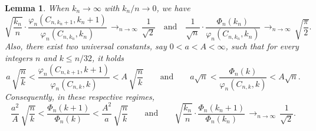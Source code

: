 \documentclass[11pt]{article}
\theoremstyle{plain}
\newtheorem{lemma}[theorem]{Lemma}
\theoremstyle{definition}
\theoremstyle{remark}
\newcommand{\cv}[1][n]{\,\mathop{\longrightarrow}^{}_{#1 \to \infty}\,}
\begin{document}
\begin{lemma}\label{lem:phi_et_Phi}
When $k_n\to\infty$ with $k_n/n\to0$, we have
\begin{equation}\label{eq:equiv_kn}
\sqrt{\frac{k_n}{n}} \cdot \frac{\varphi_n(C_{n,k_n+1},k_n+1)}{\varphi_n(C_{n,k_n},k_n)} \cv \frac{1}{\sqrt{2}}
\quad\text{and}\quad
\frac{1}{\sqrt{n}} \cdot \frac{\Phi_n(k_n)}{\varphi_{n}(C_{n,k_n},k_n)} \cv \sqrt{\frac{\pi}{2}}.
\end{equation}
Also, there exist two universal constants, say $0 < a < A < \infty$, such that for every integers $n$ and $k \le n/32$, it holds
\begin{equation}\label{eq:bornes_ratio}
a\,\sqrt{\frac{n}{k}} < \frac{\varphi_n(C_{n,k+1},k+1)}{\varphi_n(C_{n,k},k)} < A\,\sqrt{\frac{n}{k}}
\qquad\text{and}\qquad
a\sqrt{n} < \frac{\Phi_n(k)}{\varphi_{n}(C_{n,k},k)} < A \sqrt{n}.
\end{equation}
Consequently, in these respective regimes,
\[
\frac{a^2}{A}\,\sqrt{\frac{n}{k}}
< \frac{\Phi_n(k+1)}{\Phi_n(k)}
< \frac{A^2}{a}\,\sqrt{\frac{n}{k}}
\qquad\text{and}\qquad
\sqrt{\frac{k_n}{n}} \cdot \frac{\Phi_n(k_n+1)}{\Phi_n(k_n)} \cv \frac{1}{\sqrt{2}}.
\]
\end{lemma}
\end{document}
